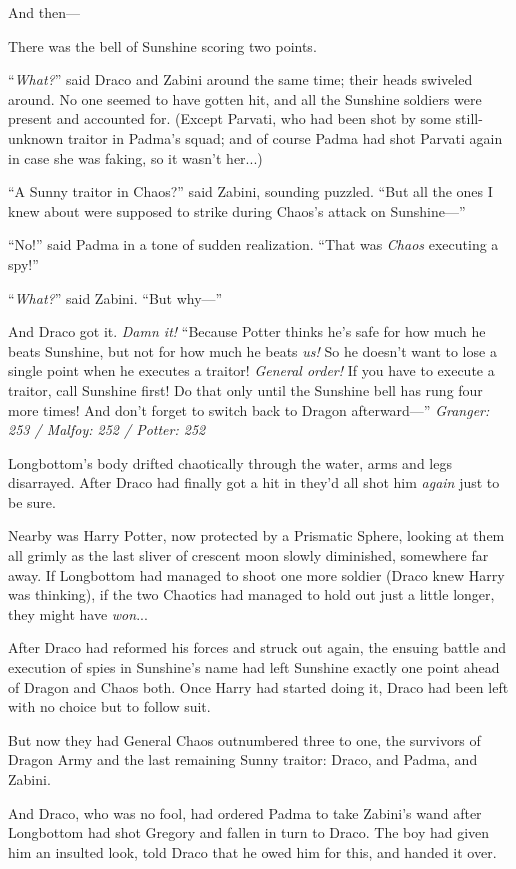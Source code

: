 And then—

There was the bell of Sunshine scoring two points.

“\emph{What?}” said Draco and Zabini around the same time; their heads swiveled around. No one seemed to have gotten hit, and all the Sunshine soldiers were present and accounted for. (Except Parvati, who had been shot by some still-unknown traitor in Padma’s squad; and of course Padma had shot Parvati again in case she was faking, so it wasn’t her...)

“A Sunny traitor in Chaos?” said Zabini, sounding puzzled. “But all the ones I knew about were supposed to strike during Chaos’s attack on Sunshine—”

“No!” said Padma in a tone of sudden realization. “That was \emph{Chaos} executing a spy!”

“\emph{What?}” said Zabini. “But why—”

And Draco got it. \emph{Damn it!} “Because Potter thinks he’s safe for how much he beats Sunshine, but not for how much he beats \emph{us!} So he doesn’t want to lose a single point when he executes a traitor! \emph{General order!} If you have to execute a traitor, call Sunshine first! Do that only until the Sunshine bell has rung four more times! And don’t forget to switch back to Dragon afterward—”
\sbreak
\emph{Granger: 253 / Malfoy: 252 / Potter: 252}

Longbottom’s body drifted chaotically through the water, arms and legs disarrayed. After Draco had finally got a hit in they’d all shot him \emph{again} just to be sure.

Nearby was Harry Potter, now protected by a Prismatic Sphere, looking at them all grimly as the last sliver of crescent moon slowly diminished, somewhere far away. If Longbottom had managed to shoot one more soldier (Draco knew Harry was thinking), if the two Chaotics had managed to hold out just a little longer, they might have \emph{won}...

After Draco had reformed his forces and struck out again, the ensuing battle and execution of spies in Sunshine’s name had left Sunshine exactly one point ahead of Dragon and Chaos both. Once Harry had started doing it, Draco had been left with no choice but to follow suit.

But now they had General Chaos outnumbered three to one, the survivors of Dragon Army and the last remaining Sunny traitor: Draco, and Padma, and Zabini.

And Draco, who was no fool, had ordered Padma to take Zabini’s wand after Longbottom had shot Gregory and fallen in turn to Draco. The boy had given him an insulted look, told Draco that he owed him for this, and handed it over.

